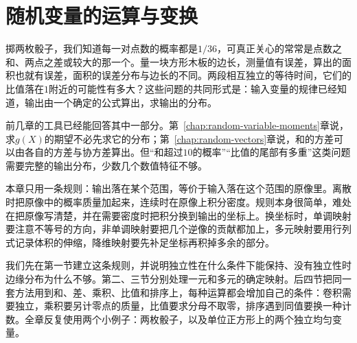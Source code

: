 \chapter{随机变量的运算与变换}
\label{chap:random-variable-transformations}

掷两枚骰子，我们知道每一对点数的概率都是$1/36$，可真正关心的常常是点数之和、两点之差或较大的那一个。量一块方形木板的边长，测量值有误差，算出的面积也就有误差，面积的误差分布与边长的不同。两段相互独立的等待时间，它们的比值落在$1$附近的可能性有多大？这些问题的共同形式是：输入变量的规律已经知道，输出由一个确定的公式算出，求输出的分布。

前几章的工具已经能回答其中一部分。第~\ref{chap:random-variable-moments}章说，求$g(X)$的期望不必先求它的分布；第~\ref{chap:random-vectors}章说，和的方差可以由各自的方差与协方差算出。但“和超过$10$的概率”“比值的尾部有多重”这类问题需要完整的输出分布，少数几个数值特征不够。

本章只用一条规则：输出落在某个范围，等价于输入落在这个范围的原像里。离散时把原像中的概率质量加起来，连续时在原像上积分密度。规则本身很简单，难处在把原像写清楚，并在需要密度时把积分换到输出的坐标上。换坐标时，单调映射要注意不等号的方向，非单调映射要把几个逆像的贡献都加上，多元映射要用行列式记录体积的伸缩，降维映射要先补足坐标再积掉多余的部分。

我们先在第一节建立这条规则，并说明独立性在什么条件下能保持、没有独立性时边缘分布为什么不够。第二、三节分别处理一元和多元的确定映射。后四节把同一套方法用到和、差、乘积、比值和排序上，每种运算都会增加自己的条件：卷积需要独立，乘积要另计零点的质量，比值要求分母不取零，排序遇到同值要换一种计数。全章反复使用两个小例子：两枚骰子，以及单位正方形上的两个独立均匀变量。
















